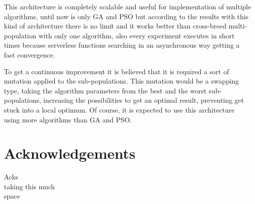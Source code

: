 \documentclass[runningheads]{llncs}
\begin{document}
This architecture is completely scalable and useful for implementation of
multiple algorithms, until now is only GA and PSO but according to the results
with this kind of architecture there is no limit and it works better than
cross-breed multi-population with only one algorithm, also every experiment executes in
short times because serverless functions searching in an asynchronous way
getting a fast convergence.



To get a continuous improvement it is believed that it is required a sort of
mutation applied to the sub-populations. This mutation would be a swapping type,
taking the algorithm parameters from the best and the worst sub-populations,
increasing the possibilities to get an optimal result, preventing get stuck into
a local optimum. Of course, it is expected to use this architecture using more
algorithms than GA and PSO.


\section*{Acknowledgements}

Acks\\
taking this much\\
space


      
  
\end{document}
